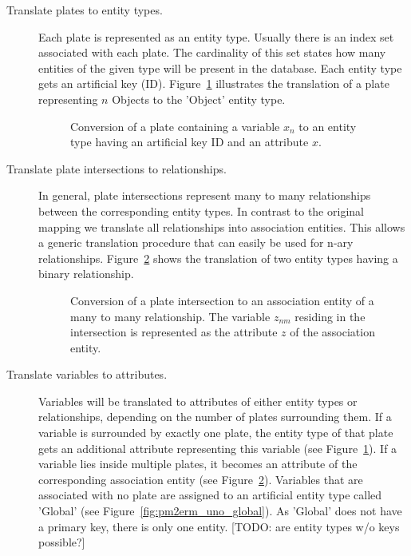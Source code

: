 \begin{description}
\item[Translate plates to entity types.] Each plate is represented as an entity type. Usually there is an index set associated with each plate. The cardinality of this set states how many entities of the given type will be present in the database. Each entity type gets an artificial key (ID). Figure~\ref{fig:pm2erm_uno_local} illustrates the translation of a plate representing $n$ Objects to the 'Object' entity type.

\begin{figure}[t]
\centering
\scalebox{\tikzScale}{\adjustTikzSize }
\caption{Conversion of a plate containing a variable $x_n$ to an entity type having an artificial key ID and an attribute $x$.}\label{fig:pm2erm_uno_local}
\end{figure}

\item[Translate plate intersections to relationships.] In general, plate intersections represent many to many relationships between the corresponding entity types. In contrast to the original mapping we translate all relationships into association entities. This allows a generic translation procedure that can easily be used for n-ary relationships. Figure~\ref{fig:pm2erm_bi_noconstraints} shows the translation of two entity types having a binary relationship.

\begin{figure}[t]
\centering
\scalebox{\tikzScale}{\adjustTikzSize }
\caption{Conversion of a plate intersection to an association entity of a many to many relationship. The variable $z_{nm}$ residing in the intersection is represented as the attribute $z$ of the association entity.}\label{fig:pm2erm_bi_noconstraints}
\end{figure}

\item[Translate variables to attributes.] Variables will be translated to attributes of either entity types or relationships, depending on the number of plates surrounding them. If a variable is surrounded by exactly one plate, the entity type of that plate gets an additional attribute representing this variable (see Figure~\ref{fig:pm2erm_uno_local}). If a variable lies inside multiple plates, it becomes an attribute of the corresponding association entity (see Figure~\ref{fig:pm2erm_bi_noconstraints}). Variables that are associated with no plate are assigned to an artificial entity type called 'Global' (see Figure~\ref{fig:pm2erm_uno_global}). As 'Global' does not have a primary key, there is only one entity. [TODO: are entity types w/o keys possible?]


\end{description}

